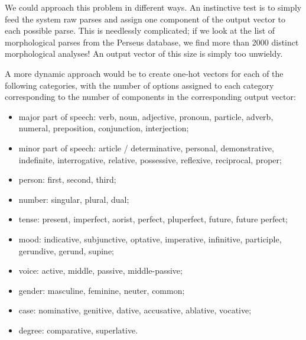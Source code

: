 We could approach this problem in different ways. An instinctive test
is to simply feed the system raw parses and assign one component of
the output vector to each possible parse. This is needlessly
complicated; if we look at the list of morphological parses from the
Perseus database, we find more than 2000 distinct morphological
analyses! An output vector of this size is simply too unwieldy.

A more dynamic approach would be to create one-hot vectors for each of
the following categories, with the number of options assigned to each
category corresponding to the number of components in the
corresponding output vector:

\begin{itemize}
\item major part of speech: verb, noun, adjective, pronoun, particle,
  adverb, numeral, preposition, conjunction, interjection;
\item minor part of speech: article / determinative, personal,
  demonstrative, indefinite, interrogative, relative, possessive,
  reflexive, reciprocal, proper;
\item person: first, second, third;
\item number: singular, plural, dual;
\item tense: present, imperfect, aorist, perfect, pluperfect,
  future, future perfect;
\item mood: indicative, subjunctive, optative, imperative,
  infinitive, participle, gerundive, gerund, supine;
\item voice: active, middle, passive, middle-passive;
\item gender: masculine, feminine, neuter, common;
\item case: nominative, genitive, dative, accusative, ablative,
  vocative;
\item degree: comparative, superlative.
\end{itemize}

